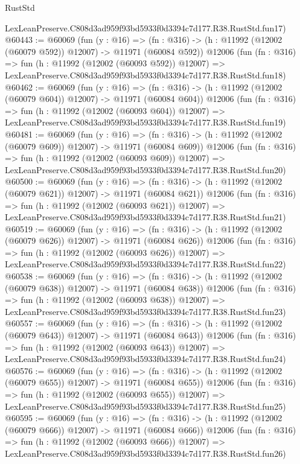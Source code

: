 \begin{lexlean}{RustStd}
\begin{coremodule}
    LexLeanPreserve.C808d3ad959f93bd5933f0d3394c7d177.R38.RustStd.fun17)
@60443 := @60069
    (fun (y : @16) =>
    (fn : @316) -> (h : @11992 (@12002 (@60079 @592)) @12007) -> @11971 (@60084 @592))
    @12006
    (fun (fn : @316) =>
    fun (h : @11992 (@12002 (@60093 @592)) @12007) =>
    LexLeanPreserve.C808d3ad959f93bd5933f0d3394c7d177.R38.RustStd.fun18)
@60462 := @60069
    (fun (y : @16) =>
    (fn : @316) -> (h : @11992 (@12002 (@60079 @604)) @12007) -> @11971 (@60084 @604))
    @12006
    (fun (fn : @316) =>
    fun (h : @11992 (@12002 (@60093 @604)) @12007) =>
    LexLeanPreserve.C808d3ad959f93bd5933f0d3394c7d177.R38.RustStd.fun19)
@60481 := @60069
    (fun (y : @16) =>
    (fn : @316) -> (h : @11992 (@12002 (@60079 @609)) @12007) -> @11971 (@60084 @609))
    @12006
    (fun (fn : @316) =>
    fun (h : @11992 (@12002 (@60093 @609)) @12007) =>
    LexLeanPreserve.C808d3ad959f93bd5933f0d3394c7d177.R38.RustStd.fun20)
@60500 := @60069
    (fun (y : @16) =>
    (fn : @316) -> (h : @11992 (@12002 (@60079 @621)) @12007) -> @11971 (@60084 @621))
    @12006
    (fun (fn : @316) =>
    fun (h : @11992 (@12002 (@60093 @621)) @12007) =>
    LexLeanPreserve.C808d3ad959f93bd5933f0d3394c7d177.R38.RustStd.fun21)
@60519 := @60069
    (fun (y : @16) =>
    (fn : @316) -> (h : @11992 (@12002 (@60079 @626)) @12007) -> @11971 (@60084 @626))
    @12006
    (fun (fn : @316) =>
    fun (h : @11992 (@12002 (@60093 @626)) @12007) =>
    LexLeanPreserve.C808d3ad959f93bd5933f0d3394c7d177.R38.RustStd.fun22)
@60538 := @60069
    (fun (y : @16) =>
    (fn : @316) -> (h : @11992 (@12002 (@60079 @638)) @12007) -> @11971 (@60084 @638))
    @12006
    (fun (fn : @316) =>
    fun (h : @11992 (@12002 (@60093 @638)) @12007) =>
    LexLeanPreserve.C808d3ad959f93bd5933f0d3394c7d177.R38.RustStd.fun23)
@60557 := @60069
    (fun (y : @16) =>
    (fn : @316) -> (h : @11992 (@12002 (@60079 @643)) @12007) -> @11971 (@60084 @643))
    @12006
    (fun (fn : @316) =>
    fun (h : @11992 (@12002 (@60093 @643)) @12007) =>
    LexLeanPreserve.C808d3ad959f93bd5933f0d3394c7d177.R38.RustStd.fun24)
@60576 := @60069
    (fun (y : @16) =>
    (fn : @316) -> (h : @11992 (@12002 (@60079 @655)) @12007) -> @11971 (@60084 @655))
    @12006
    (fun (fn : @316) =>
    fun (h : @11992 (@12002 (@60093 @655)) @12007) =>
    LexLeanPreserve.C808d3ad959f93bd5933f0d3394c7d177.R38.RustStd.fun25)
@60595 := @60069
    (fun (y : @16) =>
    (fn : @316) -> (h : @11992 (@12002 (@60079 @666)) @12007) -> @11971 (@60084 @666))
    @12006
    (fun (fn : @316) =>
    fun (h : @11992 (@12002 (@60093 @666)) @12007) =>
    LexLeanPreserve.C808d3ad959f93bd5933f0d3394c7d177.R38.RustStd.fun26)

\end{coremodule}
\end{lexlean}
